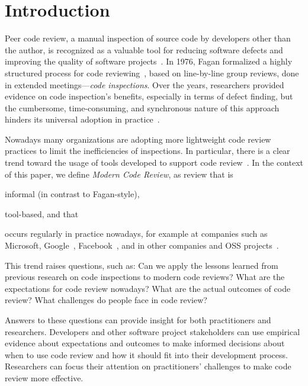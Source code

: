 
\section{Introduction} \label{sec:introduction}


Peer code review, a manual inspection of source code by developers other than
the author, is recognized as a valuable tool for reducing software defects and
improving the quality of software projects~\cite{ackerman1984software, ackerman1989software}.
In 1976, Fagan formalized a highly
structured process for code reviewing~\cite{fagan1976design}, based on line-by-line group
reviews, done in extended meetings---\emph{code inspections}. Over the years,
researchers provided evidence on code inspection's benefits, especially in
terms of defect finding, but the cumbersome, time-consuming, and synchronous
nature of this approach hinders its universal adoption in practice~\cite{shull2008inspecting}. %

Nowadays many organizations are adopting more lightweight code review
practices to limit the inefficiencies of inspections. In particular, there is a
clear trend toward the usage of tools developed to support code
review~\cite{rigby2012open}. In the context of this paper, we define
\emph{Modern Code Review}, as review that is \begin{inparaenum}[(1)]
\item informal (in contrast to Fagan-style), 
\item tool-based, and that 
\item occurs regularly in practice nowadays, for example at companies such as Microsoft, Google~\cite{kennedy2006online},
Facebook~\cite{tsotsis2011online}, and in other companies and OSS projects~\cite{gerrit2012online}. \end{inparaenum}

This trend raises questions, such as: Can we apply the lessons learned from
previous research on code inspections to modern code reviews? What are the
expectations for code review nowadays? What are the actual outcomes of code
review? What challenges do people face in code review?

Answers to these questions can provide insight for both practitioners and
researchers.  Developers and other software project stakeholders can use
empirical evidence about expectations and outcomes to make informed decisions
about when to use code review and how it should fit into their development
process. Researchers can focus their attention on practitioners' challenges to
make code review more effective.

